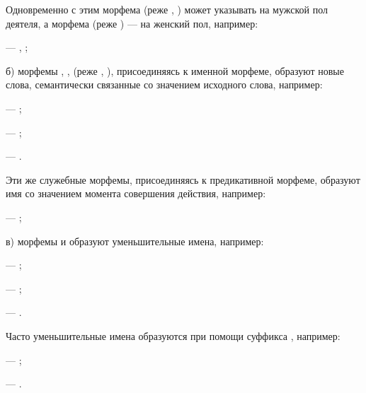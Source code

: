 Одновременно с этим морфема  (реже , ) может указывать на мужской пол деятеля, а морфема  (реже ) --- на женский пол, например:
\begin{prfsample}
    \item {} --- , ;
\end{prfsample}


б) морфемы , ,  (реже , ), присоединяясь к именной морфеме, образуют новые слова, семантически связанные со значением исходного слова, например:
\begin{prfsample}
    \item {} --- ;
    \item {} --- ;
    \item {} --- .
\end{prfsample}
Эти же служебные морфемы, присоединяясь к предикативной морфеме, образуют имя со значением момента совершения действия, например:
\begin{prfsample}
    \item {} --- ;
\end{prfsample}

в) морфемы  и  образуют уменьшительные имена, например:
\begin{prfsample}
    \item {} --- ;
    \item {} --- ;
    \item {} --- .
\end{prfsample}
Часто уменьшительные имена образуются при помощи суффикса , например:
\begin{prfsample}
    \item {} --- ;
    \item {} --- .
\end{prfsample}

